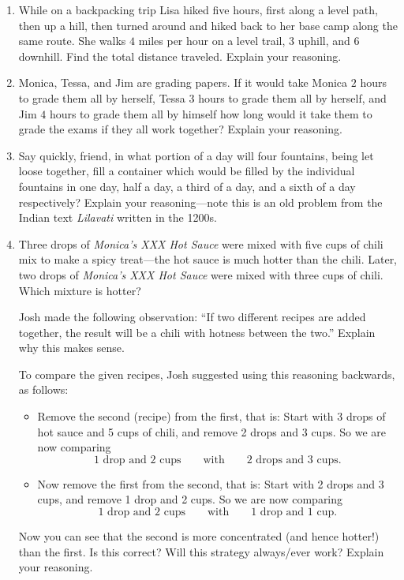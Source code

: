 \begin{problems}
\begin{enumerate}
\item While on a backpacking trip Lisa hiked five hours, first along a
  level path, then up a hill, then turned around and hiked back to her
  base camp along the same route. She walks $4$ miles per hour on a
  level trail, $3$ uphill, and $6$ downhill. Find the total distance
  traveled. Explain your reasoning.
\item Monica, Tessa, and Jim are grading papers. If it would take
  Monica $2$ hours to grade them all by herself, Tessa $3$ hours to
  grade them all by herself, and Jim $4$ hours to grade them all by
  himself how long would it take them to grade the exams if they all
  work together? Explain your reasoning.
\item Say quickly, friend, in what portion of a day will four
  fountains, being let loose together, fill a container which would
  be filled by the individual fountains in one day, half a day, a
  third of a day, and a sixth of a day respectively? Explain your
  reasoning---note this is an old problem from the Indian text
  \textit{Lilavati} written in the 1200s.
\item Three drops of \textit{Monica's XXX Hot Sauce} were mixed with
  five cups of chili mix to make a spicy treat---the hot sauce is much
  hotter than the chili. Later, two drops of \textit{Monica's XXX Hot
    Sauce} were mixed with three cups of chili. Which mixture is
  hotter? 

Josh made the following observation:  ``If two different recipes are added 
together, the result will be a chili with hotness between the two.''  Explain
why this makes sense.  

To compare the given recipes, Josh suggested using this reasoning backwards, 
as follows:  
 
\begin{itemize}
\item Remove the second (recipe) from the first, that is: Start with 3
  drops of hot sauce and 5 cups of chili, and remove 2 drops and 3
  cups. So we are now comparing
\[
\text{1 drop and 2 cups}\qquad\text{with}\qquad\text{2 drops and 3 cups.}
\]
\item Now remove the first from the second, that is: Start with 2
  drops and 3 cups, and remove 1 drop and 2 cups. So we are now
  comparing
\[
\text{1 drop and 2 cups}\qquad\text{with}\qquad\text{1 drop and 1
  cup.}
\]
\end{itemize}
Now you can see that the second is more concentrated (and hence
hotter!) than the first. Is this correct? Will this strategy
always/ever work? Explain your reasoning.
\end{enumerate}
\end{problems}

